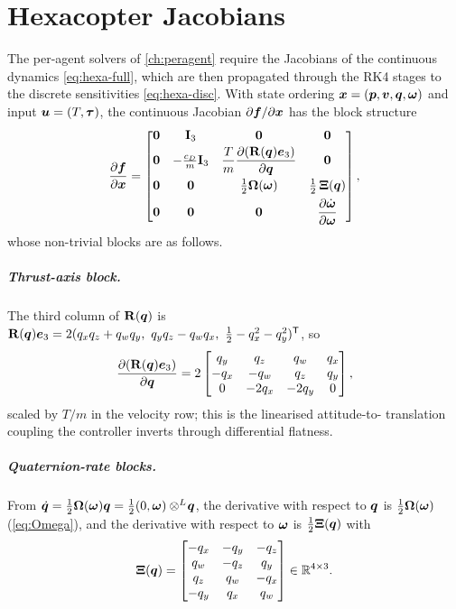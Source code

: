 \chapter{Hexacopter Jacobians}
\label{app:jac}

The per-agent solvers of \cref{ch:peragent} require the Jacobians of the
continuous dynamics \cref{eq:hexa-full}, which are then propagated through the
RK4 stages to the discrete sensitivities \cref{eq:hexa-disc}. With state ordering
$\bm{x}=(\bm{p},\bm{v},\bm{q},\bm{\omega})$ and input $\bm{u}=(T,\bm{\tau})$, the
continuous Jacobian $\partial\bm{f}/\partial\bm{x}$ has the block structure
\begin{equation}
\frac{\partial\bm{f}}{\partial\bm{x}}=
\begin{bmatrix}
\mathbf{0} & \mathbf{I}_3 & \mathbf{0} & \mathbf{0}\\[2pt]
\mathbf{0} & -\tfrac{c_D}{m}\mathbf{I}_3 & \dfrac{T}{m}\dfrac{\partial(\mathbf{R}(\bm{q})\bm{e}_3)}{\partial\bm{q}} & \mathbf{0}\\[8pt]
\mathbf{0} & \mathbf{0} & \tfrac12\bm{\Omega}(\bm{\omega}) & \tfrac12\,\mathbf{\Xi}(\bm{q})\\[4pt]
\mathbf{0} & \mathbf{0} & \mathbf{0} & \dfrac{\partial\dot{\bm{\omega}}}{\partial\bm{\omega}}
\end{bmatrix},
\end{equation}
whose non-trivial blocks are as follows.

\paragraph{Thrust-axis block.} The third column of $\mathbf{R}(\bm{q})$ is
$\mat{R}(\quat{q})\vv{e}_3=2(q_xq_z+q_wq_y,\ q_yq_z-q_wq_x,\ \tfrac12-q_x^2-q_y^2)\T$,
so
\begin{equation}
\frac{\partial(\mathbf{R}(\bm{q})\bm{e}_3)}{\partial\bm{q}}=2
\begin{bmatrix}
q_y & q_z & q_w & q_x\\
-q_x & -q_w & q_z & q_y\\
0 & -2q_x & -2q_y & 0
\end{bmatrix},
\end{equation}
scaled by $T/m$ in the velocity row; this is the linearised attitude-to-%
translation coupling the controller inverts through differential flatness.

\paragraph{Quaternion-rate blocks.} From $\dot{\bm{q}}=\tfrac12\bm{\Omega}(\bm{\omega})\bm{q}
=\tfrac12(0,\bm{\omega})\otimes^{L}\!\bm{q}$, the derivative with respect to
$\bm{q}$ is $\tfrac12\bm{\Omega}(\bm{\omega})$ (\cref{eq:Omega}), and the
derivative with respect to $\bm{\omega}$ is $\tfrac12\mathbf{\Xi}(\bm{q})$ with
\begin{equation}
\mathbf{\Xi}(\bm{q})=
\begin{bmatrix}-q_x & -q_y & -q_z\\ q_w & -q_z & q_y\\ q_z & q_w & -q_x\\ -q_y & q_x & q_w\end{bmatrix}
\in\mathbb{R}^{4\times3}.
\end{equation}

